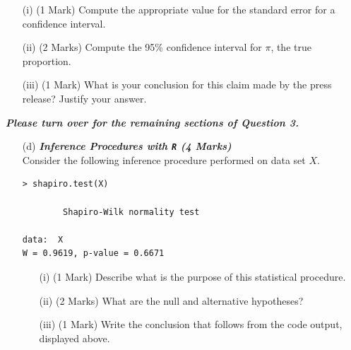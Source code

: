 \documentclass[a4paper,12pt]{article}
\begin{document}
\begin{itemize}
\begin{itemize}
\begin{itemize}
\item[(i)] (1 Mark) Compute the appropriate value for the standard error for a confidence interval.
\item[(ii)] (2 Marks) Compute the 95\% confidence interval for $\pi$, the true proportion.
\item[(iii)] (1 Mark) What is your conclusion for this claim made by the press release? Justify your answer.
\end{itemize}
\end{itemize}
{
\normalsize
\textit{\textbf{Please turn over for the remaining sections of Question 3.}}
}
%
\newpage
\begin{itemize}
\item[(d)] \textbf{\textit{ Inference Procedures with \texttt{R} (4 Marks)}}\\
Consider the following inference procedure performed on data set $X$.
\begin{center}
\begin{framed}
\begin{verbatim}
> shapiro.test(X)

        Shapiro-Wilk normality test

data:  X
W = 0.9619, p-value = 0.6671

\end{verbatim}
\end{framed}
\end{center}

\begin{itemize}
\item[(i)] (1 Mark) Describe what is the purpose of this statistical procedure.
\item[(ii)] (2 Marks) What are the null and alternative hypotheses?
\item[(iii)] (1 Mark) Write the conclusion that follows from the code output, displayed above.
\end{itemize}
\end{itemize}


\end{itemize}
\end{document}

